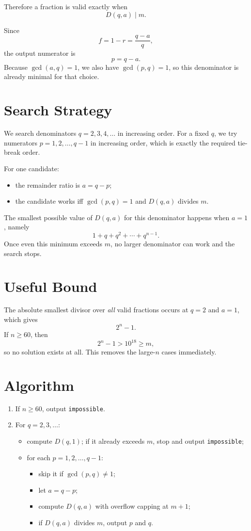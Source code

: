 \documentclass[11pt]{article}
\begin{document}
Therefore a fraction is valid exactly when
\[
    D(q,a) \mid m.
\]

Since
\[
    f = 1-r = \frac{q-a}{q},
\]
the output numerator is
\[
    p = q-a.
\]
Because $\gcd(a,q)=1$, we also have $\gcd(p,q)=1$, so this denominator is already minimal for that choice.

\section*{Search Strategy}

We search denominators $q=2,3,4,\dots$ in increasing order. For a fixed $q$, we try numerators
$p=1,2,\dots,q-1$ in increasing order, which is exactly the required tie-break order.

For one candidate:
\begin{itemize}[leftmargin=*]
    \item the remainder ratio is $a = q-p$;
    \item the candidate works iff $\gcd(p,q)=1$ and $D(q,a)$ divides $m$.
\end{itemize}

The smallest possible value of $D(q,a)$ for this denominator happens when $a=1$, namely
\[
    1 + q + q^2 + \cdots + q^{n-1}.
\]
Once even this minimum exceeds $m$, no larger denominator can work and the search stops.

\section*{Useful Bound}

The absolute smallest divisor over \emph{all} valid fractions occurs at $q=2$ and $a=1$, which gives
\[
    2^n - 1.
\]
If $n \ge 60$, then
\[
    2^n - 1 > 10^{18} \ge m,
\]
so no solution exists at all. This removes the large-$n$ cases immediately.

\section*{Algorithm}

\begin{enumerate}[leftmargin=*]
    \item If $n \ge 60$, output \texttt{impossible}.
    \item For $q = 2,3,\dots$:
    \begin{itemize}[leftmargin=*]
        \item compute $D(q,1)$; if it already exceeds $m$, stop and output \texttt{impossible};
        \item for each $p=1,2,\dots,q-1$:
        \begin{itemize}[leftmargin=*]
            \item skip it if $\gcd(p,q) \ne 1$;
            \item let $a=q-p$;
            \item compute $D(q,a)$ with overflow capping at $m+1$;
            \item if $D(q,a)$ divides $m$, output $p$ and $q$.
        \end{itemize}
    \end{itemize}
\end{enumerate}
\end{document}
